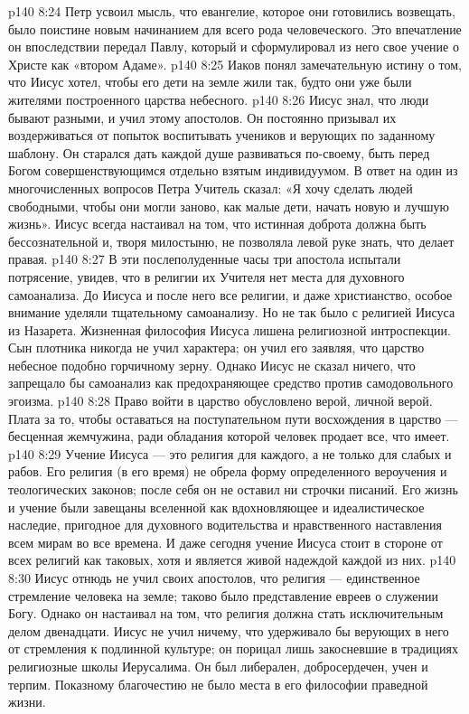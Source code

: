 \vs p140 8:24 Петр усвоил мысль, что евангелие, которое они готовились возвещать, было поистине новым начинанием для всего рода человеческого. Это впечатление он впоследствии передал Павлу, который и сформулировал из него свое учение о Христе как «втором Адаме».
\vs p140 8:25 Иаков понял замечательную истину о том, что Иисус хотел, чтобы его дети на земле жили так, будто они уже были жителями построенного царства небесного.
\vs p140 8:26 \pc Иисус знал, что люди бывают разными, и учил этому апостолов. Он постоянно призывал их воздерживаться от попыток воспитывать учеников и верующих по заданному шаблону. Он старался дать каждой душе развиваться по\hyp{}своему, быть перед Богом совершенствующимся отдельно взятым индивидуумом. В ответ на один из многочисленных вопросов Петра Учитель сказал: «Я хочу сделать людей свободными, чтобы они могли заново, как малые дети, начать новую и лучшую жизнь». Иисус всегда настаивал на том, что истинная доброта должна быть бессознательной и, творя милостыню, не позволяла левой руке знать, что делает правая.
\vs p140 8:27 В эти послеполуденные часы три апостола испытали потрясение, увидев, что в религии их Учителя нет места для духовного самоанализа. До Иисуса и после него все религии, и даже христианство, особое внимание уделяли тщательному самоанализу. Но не так было с религией Иисуса из Назарета. Жизненная философия Иисуса лишена религиозной интроспекции. Сын плотника никогда не учил  характера; он учил его  заявляя, что царство небесное подобно горчичному зерну. Однако Иисус не сказал ничего, что запрещало бы самоанализ как предохраняющее средство против самодовольного эгоизма.
\vs p140 8:28 Право войти в царство обусловлено верой, личной верой. Плата за то, чтобы оставаться на поступательном пути восхождения в царство --- бесценная жемчужина, ради обладания которой человек продает все, что имеет.
\vs p140 8:29 Учение Иисуса --- это религия для каждого, а не только для слабых и рабов. Его религия (в его время) не обрела форму определенного вероучения и теологических законов; после себя он не оставил ни строчки писаний. Его жизнь и учение были завещаны вселенной как вдохновляющее и идеалистическое наследие, пригодное для духовного водительства и нравственного наставления всем мирам во все времена. И даже сегодня учение Иисуса стоит в стороне от всех религий как таковых, хотя и является живой надеждой каждой из них.
\vs p140 8:30 Иисус отнюдь не учил своих апостолов, что религия --- единственное стремление человека на земле; таково было представление евреев о служении Богу. Однако он настаивал на том, что религия должна стать исключительным делом двенадцати. Иисус не учил ничему, что удерживало бы верующих в него от стремления к подлинной культуре; он порицал лишь закосневшие в традициях религиозные школы Иерусалима. Он был либерален, добросердечен, учен и терпим. Показному благочестию не было места в его философии праведной жизни.
